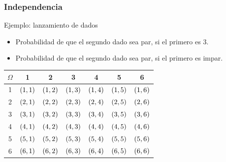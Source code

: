\documentclass[table]{beamer}
\begin{document}
\begin{frame}
    \frametitle{Independencia}
    \begin{block}{Ejemplo: lanzamiento de dados}
        \begin{itemize}
            \item Probabilidad de que el segundo dado sea par, si el primero es 3.
            \item Probabilidad de que el segundo dado sea par, si el primero es impar.
        \end{itemize}
    \end{block}
    \begin{center}
        \begin{tabular}{c|cccccc}
            $\Omega$ & 1 & 2 & 3 & 4 & 5 & 6 \\
            \hline
            1 & $\parens{1, 1}$ & $\parens{1, 2}$ & $\parens{1, 3}$ & $\parens{1, 4}$ & $\parens{1, 5}$ & $\parens{1, 6}$ \\
            2 & $\parens{2, 1}$ & $\parens{2, 2}$ & $\parens{2, 3}$ & $\parens{2, 4}$ & $\parens{2, 5}$ & $\parens{2, 6}$ \\
            3 & $\parens{3, 1}$ & $\parens{3, 2}$ & $\parens{3, 3}$ & $\parens{3, 4}$ & $\parens{3, 5}$ & $\parens{3, 6}$ \\
            4 & $\parens{4, 1}$ & $\parens{4, 2}$ & $\parens{4, 3}$ & $\parens{4, 4}$ & $\parens{4, 5}$ & $\parens{4, 6}$ \\
            5 & $\parens{5, 1}$ & $\parens{5, 2}$ & $\parens{5, 3}$ & $\parens{5, 4}$ & $\parens{5, 5}$ & $\parens{5, 6}$ \\
            6 & $\parens{6, 1}$ & $\parens{6, 2}$ & $\parens{6, 3}$ & $\parens{6, 4}$ & $\parens{6, 5}$ & $\parens{6, 6}$ \\
        \end{tabular}
    \end{center}
\end{frame}
\end{document}
